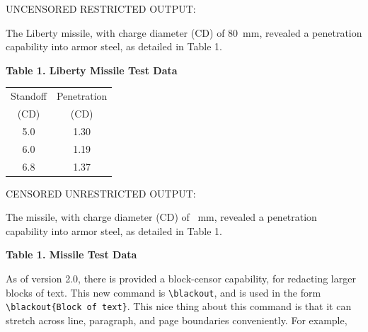 \documentclass{article}
\begin{document}
{\addtolength{\leftskip}{2.3em}
UNCENSORED RESTRICTED OUTPUT: \hrulefill

The Liberty missile, with charge diameter (CD) of
80~mm, revealed a penetration capability into armor steel, as detailed
in Table 1.

\begin{table}[ht]
\begin{center}
\textbf{Table 1. Liberty Missile Test Data}\\
\small\begin{tabular}{cc}
Standoff & Penetration \\
(CD) & (CD) \\
\hline
 5.0 & 1.30 \\
 6.0 & 1.19 \\
 6.8 & 1.37\\
\end{tabular}
\end{center}
\end{table}

\clearpage CENSORED UNRESTRICTED OUTPUT: \hrulefill

The  missile, with charge diameter (CD) of
~mm, revealed a penetration capability into armor steel, as
detailed in Table 1.

\begin{table}[ht]
\begin{center}
\textbf{Table 1.  Missile Test Data}\\
\end{center}
\end{table}
\par
\hrulefill

}


As of version 2.0, there is provided a block-censor
  capability, for redacting larger blocks of text.  
This new command is \verb|\blackout|, and is used in the form 
  \verb|\blackout{Block of text}|.  This nice thing about this command
  is that it can stretch across line, paragraph, and page boundaries 
  conveniently.
For example,
\end{document}
